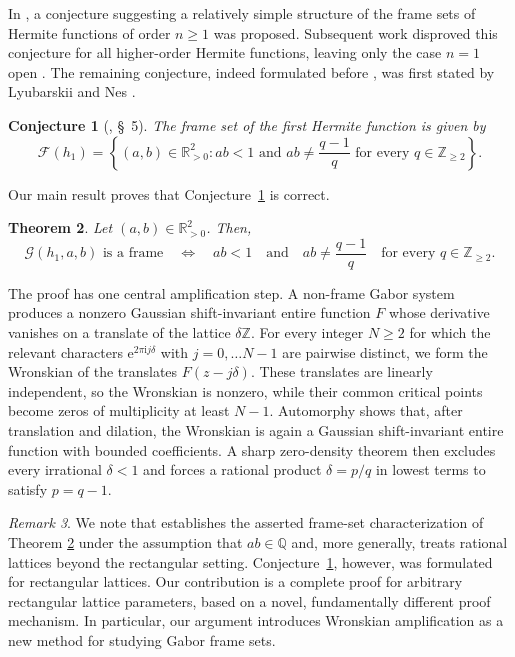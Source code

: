 \documentclass[11pt]{amsart}
\numberwithin{equation}{section}
\newtheorem{theorem}{Theorem}[section]
\newtheorem{conjecture}[theorem]{Conjecture}
\theoremstyle{definition}
\theoremstyle{remark}
\newtheorem{remark}[theorem]{Remark}
\newcommand{\R}{\mathbb R}
\newcommand{\Z}{\mathbb Z}
\newcommand{\ii}{\mathrm i}
\newcommand{\e}{\mathrm e}
\newcommand{\cG}{\mathcal G}
\newcommand{\cF}{\mathcal F}
\begin{document}
In \cite{Gro14}, a conjecture suggesting a relatively simple structure of the frame sets of Hermite functions of order $n\geq1$ was proposed. Subsequent work disproved this conjecture for all higher-order Hermite functions, leaving only the case $n=1$ open \cite{Lem17,HorLemVid25}. The remaining conjecture, indeed formulated before \cite{Gro14}, was first stated by Lyubarskii and Nes \cite{LN}.
\begin{conjecture}[\cite{LN}, \S~5]\label{conj:h1}
    The frame set of the first Hermite function is given by
    \begin{equation}
        \cF(h_1)
        =\left\{(a,b) \in \R_{>0}^2:
        ab<1
        \text{ and }
        ab\neq\frac{q-1}{q}
        \text{ for every }q\in\Z_{\geq2}
        \right\}.
    \end{equation}
\end{conjecture}
Our main result proves that Conjecture~\ref{conj:h1} is correct.

\begin{theorem}\label{thm:main}
  Let $(a,b) \in \R_{>0}^2$. Then, 
  \begin{equation}\label{eq:mainequivalence}
    \cG(h_1,a,b)\text{ is a frame}
    \quad\Longleftrightarrow\quad
    ab<1
    \quad\text{and}\quad
    ab\neq \frac{q-1}{q}
    \quad\text{for every }q\in\Z_{\geq2}.
  \end{equation}
\end{theorem}
The proof has one central amplification step. A non-frame Gabor system produces a nonzero Gaussian shift-invariant entire function $F$ whose derivative vanishes on a translate of the lattice $\delta\Z$. For every integer $N\geq2$ for which the relevant characters $\e^{2 \pi \ii j \delta}$ with $j=0, \ldots N-1$ are pairwise distinct, we form the Wronskian of the translates $F(z-j\delta)$. These translates are linearly independent, so the Wronskian is nonzero, while their common critical points become zeros of multiplicity at least $N-1$. Automorphy shows that, after translation and dilation, the Wronskian is again a Gaussian shift-invariant entire function with bounded coefficients. A sharp zero-density theorem then excludes every irrational $\delta<1$ and forces a rational product $\delta=p/q$ in lowest terms to satisfy $p=q-1$.
\begin{remark}
    We note that \cite{LieShafTay} establishes the asserted frame-set characterization of Theorem \ref{thm:main} under the assumption that $ab\in\mathbb Q$ and, more generally, treats rational lattices beyond the rectangular setting. Conjecture~\ref{conj:h1}, however, was formulated for rectangular lattices. Our contribution is a complete proof for arbitrary rectangular lattice parameters, based on a novel, fundamentally different proof mechanism. In particular, our argument introduces Wronskian amplification as a new method for studying Gabor frame sets.
\end{remark}
\end{document}
